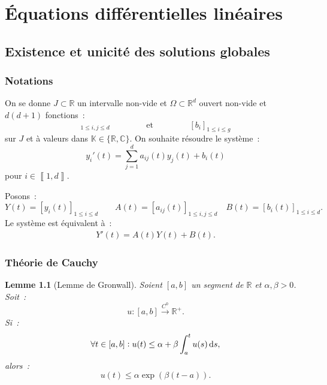 \documentclass{report}
\newtheorem{lem}[thm]{Lemme}
\theoremstyle{definition}
\theoremstyle{remark}
\numberwithin{equation}{section}
\newcommand{\K}{\mathbb K}
\newcommand{\C}{\mathbb C}
\newcommand{\R}{\mathbb R}
\newcommand{\intint}[2]{\left\llbracket#1, #2\right\rrbracket}
\newcommand{\toC}[1]{\xrightarrow{C^{#1}}}
\begin{document}
\chapter{Équations différentielles linéaires}
	\section{Existence et unicité des solutions globales}
		\subsection{Notations}
			On se donne $J \subset \R$ un intervalle non-vide et $\Omega \subset \R^d$ ouvert non-vide et $d(d+1)$ fonctions~:
			\begin{equation}
				[a_{ij}]_{1 \leq i, j \leq d} \qquad\qquad \text{ et } \qquad\qquad [b_i]_{1 \leq i \leq g}
			\end{equation}
			sur $J$ et à valeurs dans $\K \in \{\R, \C\}$. On souhaite résoudre le système~:
			\begin{equation}
				y_i'(t) = \sum_{j=1}^da_{ij}(t)y_j(t) + b_i(t)
			\end{equation}
			pour $i \in \intint 1d$.

			Posons~:
			\begin{equation}
				Y(t) = [y_i(t)]_{1 \leq i \leq d} \qquad A(t) = [a_{ij}(t)]_{1 \leq i, j \leq d} \quad B(t) = [b_i(t)]_{1 \leq i \leq d}.
			\end{equation}
			Le système est équivalent à~:
			\begin{align}\label{eq:PCL}\tag{PCL}
				Y'(t) = A(t)Y(t) + B(t).
			\end{align}

		\subsection{Théorie de Cauchy}
			\begin{lem}[Lemme de Gronwall] Soient $[a, b]$ un segment de $\R$ et $\alpha, \beta > 0$. Soit~:
			\begin{equation}
				u : [a, b] \toC0 \R^+.
			\end{equation}
			Si~:
			\begin{equation}
				\forall t \in [a, b] : u(t) \leq \alpha + \beta\int_a^tu(s)\dif s,
			\end{equation}
			alors~:
			\begin{equation}
				u(t) \leq \alpha\exp\left(\beta(t-a)\right).
			\end{equation}
			\end{lem}
\end{document}
